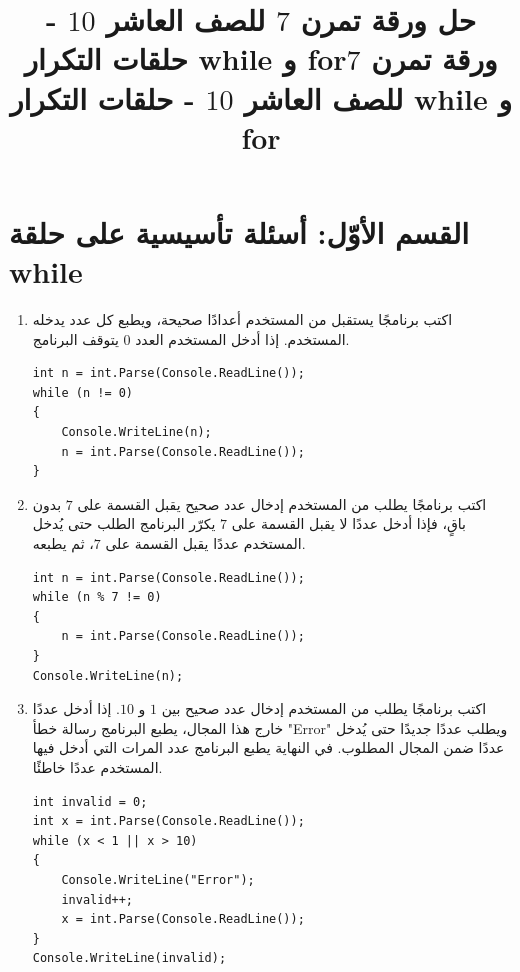 \documentclass[14pt]{extarticle}
\title{حل ورقة تمرن $7$ للصف العاشر $10$ - حلقات التكرار \textenglish{while} و \textenglish{for}}
\title{ورقة تمرن $7$ للصف العاشر $10$ - حلقات التكرار \textenglish{while} و \textenglish{for}}
\begin{document}
\maketitle
\thispagestyle{fancy}

\section*{القسم الأوّل: أسئلة تأسيسية على حلقة \textenglish{while}}

\begin{enumerate}[itemsep=1em]

\item اكتب برنامجًا يستقبل من المستخدم أعدادًا صحيحة، ويطبع كل عدد يدخله المستخدم. إذا أدخل المستخدم العدد $0$ يتوقف البرنامج.
\ifwithsols
\begin{boxSolution}
\begin{english}
\begin{verbatim}
int n = int.Parse(Console.ReadLine());
while (n != 0)
{
    Console.WriteLine(n);
    n = int.Parse(Console.ReadLine());
}
\end{verbatim}
\end{english}
\end{boxSolution}
\fi
\filbreak

\item اكتب برنامجًا يطلب من المستخدم إدخال عدد صحيح يقبل القسمة على $7$ بدون باقٍ، فإذا أدخل عددًا لا يقبل القسمة على $7$ يكرّر البرنامج الطلب حتى يُدخل المستخدم عددًا يقبل القسمة على $7$، ثم يطبعه.
\ifwithsols
\begin{boxSolution}
\begin{english}
\begin{verbatim}
int n = int.Parse(Console.ReadLine());
while (n % 7 != 0)
{
    n = int.Parse(Console.ReadLine());
}
Console.WriteLine(n);
\end{verbatim}
\end{english}
\end{boxSolution}
\fi
\filbreak

\item اكتب برنامجًا يطلب من المستخدم إدخال عدد صحيح بين $1$ و $10$. إذا أدخل عددًا خارج هذا المجال، يطبع البرنامج رسالة خطأ \textenglish{"Error"} ويطلب عددًا جديدًا حتى يُدخل عددًا ضمن المجال المطلوب. في النهاية يطبع البرنامج عدد المرات التي أدخل فيها المستخدم عددًا خاطئًا.
\ifwithsols
\begin{boxSolution}
\begin{english}
\begin{verbatim}
int invalid = 0;
int x = int.Parse(Console.ReadLine());
while (x < 1 || x > 10)
{
    Console.WriteLine("Error");
    invalid++;
    x = int.Parse(Console.ReadLine());
}
Console.WriteLine(invalid);
\end{verbatim}
\end{english}
\end{boxSolution}
\fi
\filbreak


\end{enumerate}
\end{document}
